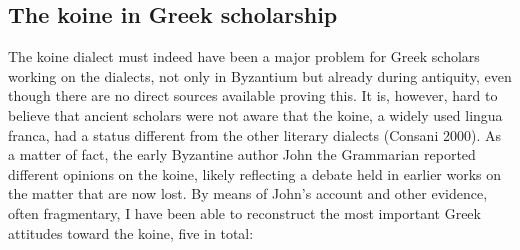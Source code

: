 \subsection{The koine in Greek scholarship}
\hypertarget{Toc19704809}{}\begin{styleStandard}
The koine dialect must indeed have been a major problem for Greek scholars working on the dialects, not only in Byzantium but already during antiquity, even though there are no direct sources available proving this. It is, however, hard to believe that ancient scholars were not aware that the koine, a widely used lingua franca, had a status different from the other literary dialects (Consani 2000). As a matter of fact, the early Byzantine author John the Grammarian reported different opinions on the koine, likely reflecting a debate held in earlier works on the matter that are now lost. By means of John’s account and other evidence, often fragmentary, I have been able to reconstruct the most important Greek attitudes toward the koine, five in total:
\end{styleStandard}


